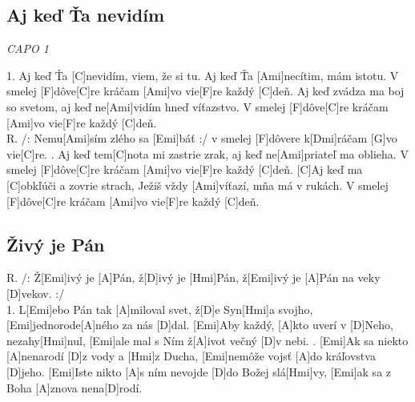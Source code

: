 \documentclass[10pt]{article}
\begin{document}
\begin{Large}
\begin{minipage}{\textwidth}
\subsection{Aj keď Ťa nevidím}
\textit{CAPO 1}
\begin{multicols*}{2}
\begin{guitar}	
	1. Aj keď Ťa [C]nevidím, viem, že si tu.
	Aj keď Ťa [Ami]necítim, mám istotu.
	V smelej [F]dôve[C]re kráčam [Ami]vo vie[F]re každý [C]deň.
	Aj keď zvádza ma boj so svetom,
	aj keď ne[Ami]vidím hneď víťazstvo.
	V smelej [F]dôve[C]re kráčam [Ami]vo vie[F]re každý [C]deň.
	\\
	R. /: Nemu[Ami]sím zlého sa [Emi]báť :/
	v smelej [F]dôvere k[Dmi]ráčam [G]vo vie[C]re.
	. Aj keď tem[C]nota mi zastrie zrak,
	aj keď ne[Ami]priateľ ma oblieha.
	V smelej [F]dôve[C]re kráčam [Ami]vo vie[F]re každý [C]deň.
	[C]Aj keď ma [C]obkľúči a zovrie strach,
	Ježiš vždy [Ami]víťazí, mňa má v rukách.
	V smelej [F]dôve[C]re kráčam [Ami]vo vie[F]re každý [C]deň.
\end{guitar}
\end{multicols*}
\end{minipage}

\begin{minipage}{\textwidth}
\subsection{Živý je Pán}
\begin{multicols*}{2}
\begin{guitar}	
	R. /: Ž[Emi]ivý je [A]Pán, ž[D]ivý je [Hmi]Pán, 
	ž[Emi]ivý je [A]Pán na veky [D]vekov. :/
	\\
	1. L[Emi]ebo Pán tak [A]miloval svet, ž[D]e Syn[Hmi]a svojho,
	[Emi]jednorode[A]ného za nás [D]dal.
	[Emi]Aby každý, [A]kto uverí v [D]Neho, nezahy[Hmi]nul, 
	[Emi]ale mal s Ním ž[A]ivot večný [D]v nebi.
	. [Emi]Ak sa niekto [A]nenarodí [D]z vody a [Hmi]z Ducha,
	[Emi]nemôže vojsť [A]do kráľovstva [D]jeho.
	[Emi]Iste nikto [A]s ním nevojde [D]do Božej slá[Hmi]vy, 
	[Emi]ak sa z Boha [A]znova nena[D]rodí.
\end{guitar}
\end{multicols*}
\end{minipage}

\begin{minipage}{\textwidth}

\end{minipage}
\end{Large}
\end{document}
